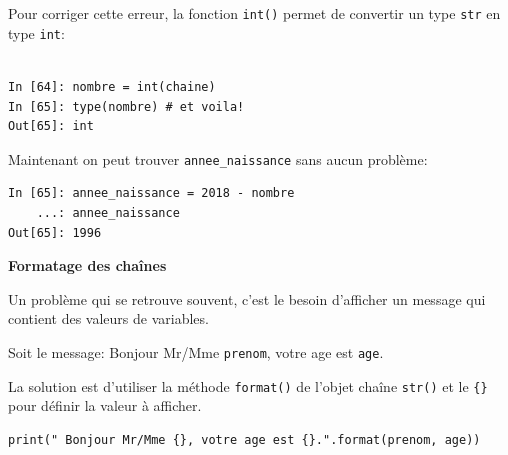 \documentclass{beamer}
\begin{document}
\begin{frame}

Pour corriger cette erreur, la fonction \texttt{int()} permet de convertir un type \texttt{str} en type \texttt{int}:

\begin{verbatim}

In [64]: nombre = int(chaine)
In [65]: type(nombre) # et voila!
Out[65]: int
\end{verbatim}

Maintenant on peut trouver \Verb!annee_naissance! sans aucun problème:
\begin{verbatim}
In [65]: annee_naissance = 2018 - nombre
    ...: annee_naissance
Out[65]: 1996
\end{verbatim}
\end{frame}

\begin{frame}

\noindent\textbf{ Formatage des chaînes}

Un problème qui se retrouve souvent, c’est le besoin d’afficher un message qui contient des valeurs de variables.

Soit le message: Bonjour Mr/Mme \texttt{prenom}, votre age est \texttt{age}.

La solution est d'utiliser la méthode \texttt{format()} de l'objet chaîne \texttt{str()} et le \Verb!{}! pour définir la valeur à afficher.

\begin{verbatim}
print(" Bonjour Mr/Mme {}, votre age est {}.".format(prenom, age))
\end{verbatim}
\end{frame}
\end{document}
